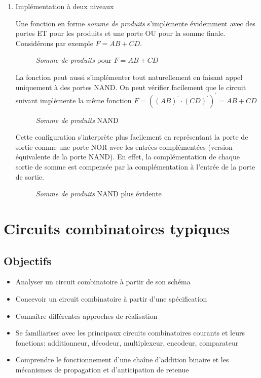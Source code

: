 \documentclass[letter, oneside]{book}
\begin{document}
\begin{enumerate}
\item Implémentation à deux niveaux
\label{sec:orge1cbe21}

Une fonction en forme \emph{somme de produits} s'implémente évidemment avec
des portes ET pour les produits et une porte OU pour la somme
finale. Considérons par exemple \(F = AB + CD\).

\begin{figure}[htbp]
\centering

\caption{\label{fig:org9e5e4f7}\emph{Somme de produits} pour \(F = AB + CD\)}
\end{figure} 

La fonction peut aussi s'implémenter tout naturellement en faisant
appel uniquement à des portes NAND. On peut vérifier facilement que le
circuit suivant implémente la même fonction \(F = ((AB)^\prime \cdot
(CD)^\prime)^\prime = AB + CD\)

\begin{figure}[htbp]
\centering

\caption{\label{fig:orgddd0b3e}\emph{Somme de produits} NAND}
\end{figure} 

Cette configuration s'interprète plus facilement en représentant la
porte de sortie comme une porte NOR avec les entrées complémentées
(version équivalente de la porte NAND). En effet, la complémentation
de chaque sortie de somme est compensée par la complémentation à
l'entrée de la porte de sortie.

\begin{figure}[htbp]
\centering

\caption{\label{fig:orge78dd26}\emph{Somme de produits} NAND plus évidente}
\end{figure}
\end{enumerate}

\chapter{Circuits combinatoires typiques}
\label{sec:org5f592e3}
\section{Objectifs}
\label{sec:org9c62375}
\begin{itemize}
\item Analyser un circuit combinatoire à partir de son schéma
\item Concevoir un circuit combinatoire à partir d'une spécification
\item Connaître différentes approches de réalisation
\item Se familiariser avec les principaux circuits combinatoires courants et
leurs fonctions: additionneur, décodeur, multiplexeur, encodeur,
comparateur
\item Comprendre le fonctionnement d'une chaîne d'addition binaire et les
mécanismes de propagation et d'anticipation de retenue
\end{itemize}
\end{document}
